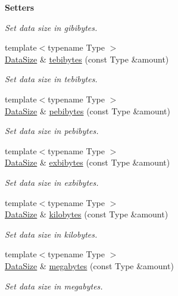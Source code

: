 \begin{Indent}{\bf Setters}
\begin{DoxyCompactItemize}
\begin{DoxyCompactList}\small\item\em Set data size in gibibytes. \end{DoxyCompactList}\item 
{\footnotesize template$<$typename Type $>$ }\\\hyperlink{exceptionmagrathea_1_1DataSize}{Data\-Size} \& \hyperlink{exceptionmagrathea_1_1DataSize_a15d9fe713e47a1512b3febbf79dd196f}{tebibytes} (const Type \&amount)
\begin{DoxyCompactList}\small\item\em Set data size in tebibytes. \end{DoxyCompactList}\item 
{\footnotesize template$<$typename Type $>$ }\\\hyperlink{exceptionmagrathea_1_1DataSize}{Data\-Size} \& \hyperlink{exceptionmagrathea_1_1DataSize_a2a7dff5ed4c768db5234e18ccbb29e61}{pebibytes} (const Type \&amount)
\begin{DoxyCompactList}\small\item\em Set data size in pebibytes. \end{DoxyCompactList}\item 
{\footnotesize template$<$typename Type $>$ }\\\hyperlink{exceptionmagrathea_1_1DataSize}{Data\-Size} \& \hyperlink{exceptionmagrathea_1_1DataSize_a6571b0c392de8bbb76c8434df52f177a}{exbibytes} (const Type \&amount)
\begin{DoxyCompactList}\small\item\em Set data size in exbibytes. \end{DoxyCompactList}\item 
{\footnotesize template$<$typename Type $>$ }\\\hyperlink{exceptionmagrathea_1_1DataSize}{Data\-Size} \& \hyperlink{exceptionmagrathea_1_1DataSize_a1b0bf5944f02d9542a72ec522bb3a155}{kilobytes} (const Type \&amount)
\begin{DoxyCompactList}\small\item\em Set data size in kilobytes. \end{DoxyCompactList}\item 
{\footnotesize template$<$typename Type $>$ }\\\hyperlink{exceptionmagrathea_1_1DataSize}{Data\-Size} \& \hyperlink{exceptionmagrathea_1_1DataSize_a9dfc314fd344037a6fd010790fe29d0e}{megabytes} (const Type \&amount)
\begin{DoxyCompactList}\small\item\em Set data size in megabytes. \end{DoxyCompactList}\item 

\end{DoxyCompactItemize}
\end{Indent}
